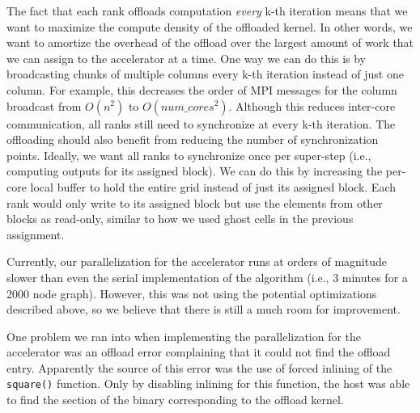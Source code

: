 The fact that each rank offloads computation \emph{every} k-th iteration
means that we want to maximize the compute density of the offloaded
kernel. In other words, we want to amortize the overhead of the offload
over the largest amount of work that we can assign to the accelerator at
a time. One way we can do this is by broadcasting chunks of multiple
columns every k-th iteration instead of just one column. For example,
this decreases the order of MPI messages for the column broadcast from
$O(n^2)$ to $O(num\_cores^2)$. Although this reduces inter-core
communication, all ranks still need to synchronize at every k-th
iteration. The offloading should also benefit from reducing the number of
synchronization points. Ideally, we want all ranks to synchronize once
per super-step (i.e., computing outputs for its assigned block). We can
do this by increasing the per-core local buffer to hold the entire grid
instead of just its assigned block. Each rank would only write to its
assigned block but use the elements from other blocks as read-only,
similar to how we used ghost cells in the previous assignment.

Currently, our parallelization for the accelerator runs at orders of
magnitude slower than even the serial implementation of the algorithm
(i.e., 3 minutes for a 2000 node graph). However, this was not using the
potential optimizations described above, so we believe that there is
still a much room for improvement.

One problem we ran into when implementing the parallelization for the
accelerator was an offload error complaining that it could not find the
offload entry. Apparently the source of this error was the use of forced
inlining of the \texttt{square()} function. Only by disabling inlining
for this function, the host was able to find the section of the binary
corresponding to the offload kernel.
